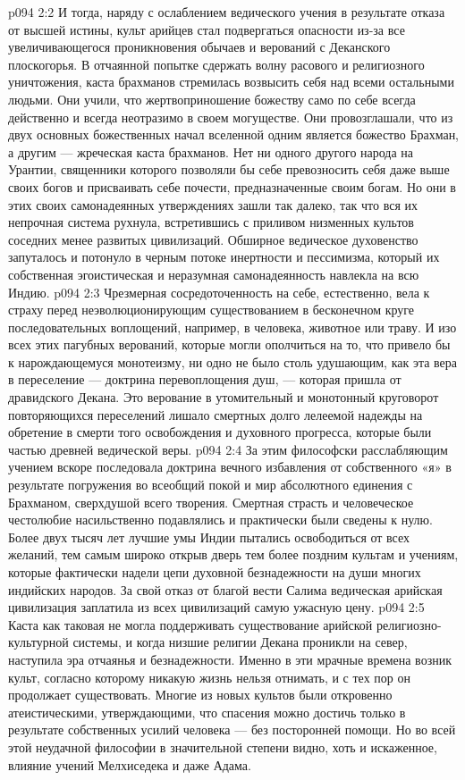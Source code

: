 \vs p094 2:2 И тогда, наряду с ослаблением ведического учения в результате отказа от высшей истины, культ арийцев стал подвергаться опасности из\hyp{}за все увеличивающегося проникновения обычаев и верований с Деканского плоскогорья. В отчаянной попытке сдержать волну расового и религиозного уничтожения, каста брахманов стремилась возвысить себя над всеми остальными людьми. Они учили, что жертвоприношение божеству само по себе всегда действенно и всегда неотразимо в своем могуществе. Они провозглашали, что из двух основных божественных начал вселенной одним является божество Брахман, а другим --- жреческая каста брахманов. Нет ни одного другого народа на Урантии, священники которого позволяли бы себе превозносить себя даже выше своих богов и присваивать себе почести, предназначенные своим богам. Но они в этих своих самонадеянных утверждениях зашли так далеко, так что вся их непрочная система рухнула, встретившись с приливом низменных культов соседних менее развитых цивилизаций. Обширное ведическое духовенство запуталось и потонуло в черным потоке инертности и пессимизма, который их собственная эгоистическая и неразумная самонадеянность навлекла на всю Индию.
\vs p094 2:3 Чрезмерная сосредоточенность на себе, естественно, вела к страху перед неэволюционирующим существованием в бесконечном круге последовательных воплощений, например, в человека, животное или траву. И изо всех этих пагубных верований, которые могли ополчиться на то, что привело бы к нарождающемуся монотеизму, ни одно не было столь удушающим, как эта вера в переселение --- доктрина перевоплощения душ, --- которая пришла от дравидского Декана. Это верование в утомительный и монотонный круговорот повторяющихся переселений лишало смертных долго лелеемой надежды на обретение в смерти того освобождения и духовного прогресса, которые были частью древней ведической веры.
\vs p094 2:4 За этим философски расслабляющим учением вскоре последовала доктрина вечного избавления от собственного «я» в результате погружения во всеобщий покой и мир абсолютного единения с Брахманом, сверхдушой всего творения. Смертная страсть и человеческое честолюбие насильственно подавлялись и практически были сведены к нулю. Более двух тысяч лет лучшие умы Индии пытались освободиться от всех желаний, тем самым широко открыв дверь тем более поздним культам и учениям, которые фактически надели цепи духовной безнадежности на души многих индийских народов. За свой отказ от благой вести Салима ведическая арийская цивилизация заплатила из всех цивилизаций самую ужасную цену.
\vs p094 2:5 \pc Каста как таковая не могла поддерживать существование арийской религиозно\hyp{}культурной системы, и когда низшие религии Декана проникли на север, наступила эра отчаянья и безнадежности. Именно в эти мрачные времена возник культ, согласно которому никакую жизнь нельзя отнимать, и с тех пор он продолжает существовать. Многие из новых культов были откровенно атеистическими, утверждающими, что спасения можно достичь только в результате собственных усилий человека --- без посторонней помощи. Но во всей этой неудачной философии в значительной степени видно, хоть и искаженное, влияние учений Мелхиседека и даже Адама.

